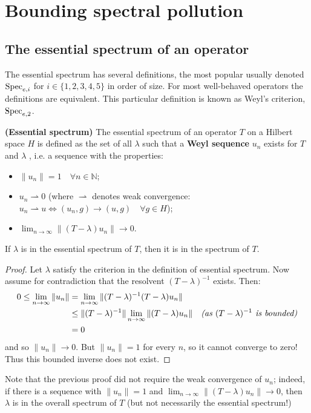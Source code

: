 \documentclass[../main.tex]{subfiles}
\begin{document}
\section{Bounding spectral pollution}

\subsection{The essential spectrum of an operator}
The essential spectrum has several definitions, 
the most popular usually denoted $\mathrm{Spec}_{e,i}$ for $i \in \{1,2,3,4,5\}$ in order of size. For 
most well-behaved operators the definitions are equivalent. This particular definition 
is known as Weyl's criterion, $\mathrm{Spec}_{e, 2}$. \cite{edmunds2018spectral}

\begin{definition}{\textbf{(Essential spectrum)}}
The essential spectrum of an operator $T$ on a Hilbert space $H$ 
is defined as the set of all $\lambda$ such that a \textbf{Weyl sequence} $u_n$ exists for $T$ and $\lambda$ , i.e. a sequence with the properties:
\begin{itemize}
\item $\|u_n\| = 1\quad \forall n \in \mathbb{N}$;
\item $u_n \rightharpoonup 0$ (where $\rightharpoonup$ denotes weak convergence: $u_n \rightharpoonup u \Leftrightarrow (u_n, g) \rightarrow (u, g) \quad \forall g \in H$);
\item $\lim_{n \rightarrow \infty}\|(T - \lambda)u_n\|  \rightarrow 0$.
\end{itemize}
\end{definition}

\begin{proposition}\label{thm:ess-in-spec}
If $\lambda$ is in the essential spectrum of $T$, then it is in the spectrum of $T$.
\end{proposition}
\begin{proof}
Let $\lambda$ satisfy the criterion in the definition of essential spectrum. Now assume for contradiction that the resolvent $(T - \lambda)^{-1}$ exists. Then:
\begin{align*}
0 \leq \lim_{n \rightarrow \infty} \|u_n\| & = \lim_{n \rightarrow \infty} \|(T - \lambda)^{-1}(T - \lambda)u_n\| & \\
& \leq \|(T - \lambda)^{-1}\| \lim_{n \rightarrow \infty} \|(T - \lambda)u_n\| & \text{\emph{(as $(T - \lambda)^{-1}$ is bounded)}}\\
& = 0
\end{align*}
and so $\|u_n\| \rightarrow 0$. But $\|u_n\| = 1$ for every $n$, so it cannot converge to zero! Thus this bounded inverse does not exist.
\end{proof}
\begin{corollary}
Note that the previous proof did not require the weak convergence of $u_n$; indeed, if there is a sequence with $\|u_n\| = 1$ and $\lim_{n \rightarrow \infty}\|(T - \lambda)u_n\|  \rightarrow 0$,
then $\lambda$ is in the overall spectrum of $T$ (but not necessarily the essential spectrum!)
\end{corollary}
\end{document}
